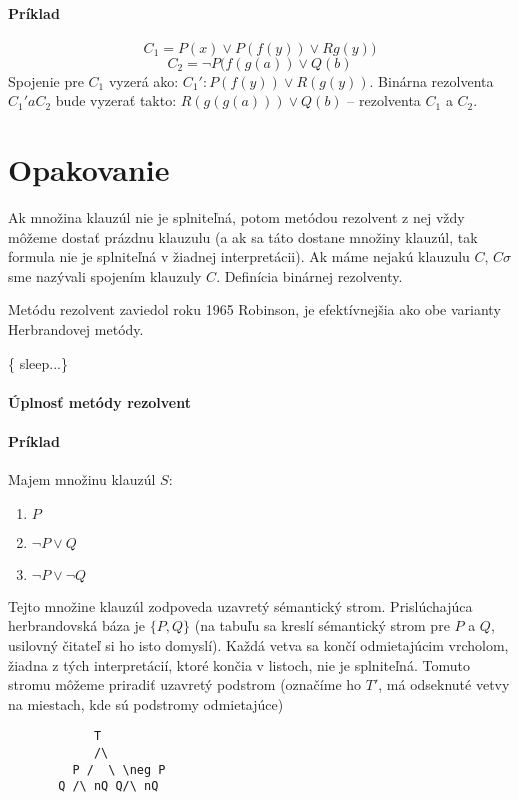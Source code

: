 \paragraph{Príklad} $$C_1 = P(x) \lor P(f(y))\lor Rg(y))$$
$$ C_2 = \neg P(f(g(a)) \lor Q(b)$$
Spojenie pre $C_1$ vyzerá ako: $C_1': P(f(y)) \lor R(g(y))$.
Binárna rezolventa $C_1' a C_2$ bude vyzerať takto: $R(g(g(a))) \lor Q(b)$ --
rezolventa $C_1$ a $C_2$.


\section{Opakovanie}
	Ak množina klauzúl nie je splniteľná, potom metódou rezolvent z nej vždy
	môžeme dostať prázdnu klauzulu (a ak sa táto dostane množiny klauzúl,
	tak formula nie je splniteľná v žiadnej interpretácii). Ak máme nejakú
	klauzulu $C$, $C\sigma$ sme nazývali spojením klauzuly $C$. Definícia
	binárnej rezolventy. 

\par  Metódu rezolvent zaviedol roku 1965 Robinson, je efektívnejšia ako obe
varianty Herbrandovej metódy. 

\par \{ sleep...\}

\paragraph{Úplnosť metódy rezolvent}

\paragraph{Príklad} Majem množinu klauzúl $S$:
\begin{enumerate}
	\item $P$
	\item $\neg P\lor Q$
	\item $\neg P \lor \neg Q$
\end{enumerate}
Tejto množine klauzúl zodpoveda uzavretý sémantický strom.
Prislúchajúca herbrandovská báza je $\{P, Q\}$ (na tabuľu sa kreslí sémantický
strom pre $P$ a $Q$, usilovný čitateľ si ho isto domyslí). Každá vetva sa končí
odmietajúcim vrcholom, žiadna z tých interpretácií, ktoré končia v listoch, nie
je splniteľná. Tomuto stromu môžeme priradiť uzavretý podstrom (označíme ho
$T'$,  má odseknuté vetvy na miestach, kde sú podstromy odmietajúce)


\begin{verbatim}
            T
            /\
         P /  \ \neg P
       Q /\ nQ Q/\ nQ 
\end{verbatim}


